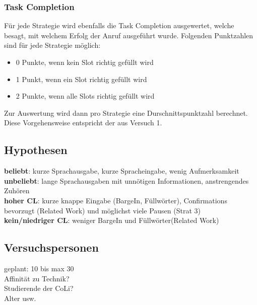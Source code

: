 \documentclass[12pt,a4paper]{scrartcl}
\begin{document}
\subsubsection{Task Completion}
Für jede Strategie wird ebenfalls die Task Completion ausgewertet, welche besagt, mit welchem Erfolg der Anruf ausgeführt wurde. Folgenden Punktzahlen sind für jede Strategie möglich:
\begin{itemize}
\item 0 Punkte, wenn kein Slot richtig gefüllt wird
\item 1 Punkt, wenn ein Slot richtig gefüllt wird
\item 2 Punkte, wenn alle Slots richtig gefüllt wird
\end{itemize}
Zur Auswertung wird dann pro Strategie eine Durschnittspunktzahl berechnet.
Diese Vorgehensweise entspricht der aus Versuch 1. 
\subsection{Hypothesen}
\textbf{beliebt}: kurze Sprachausgabe, kurze Spracheingabe, wenig Aufmerksamkeit \\
\textbf{unbeliebt}: lange Sprachausgaben mit unnötigen Informationen, anstrengendes Zuhören\\
\textbf{hoher CL}: kurze knappe Eingabe (BargeIn, Füllwörter), Confirmations bevorzugt (Related Work) und möglichst viele Pausen (Strat 3)\\
\textbf{kein/niedriger CL}: weniger BargeIn und Füllwörter(Related Work)


\subsection{Versuchspersonen}
geplant: 10 bis max 30\\
Affinität zu Technik?\\
Studierende der CoLi?\\
Alter usw.\\
\end{document}
